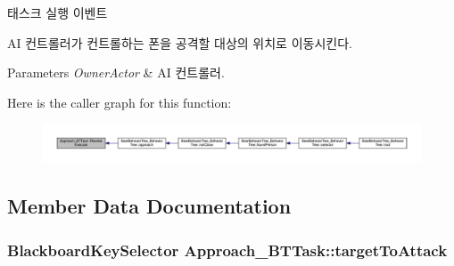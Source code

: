태스크 실행 이벤트 

AI 컨트롤러가 컨트롤하는 폰을 공격할 대상의 위치로 이동시킨다. 
\begin{DoxyParams}{Parameters}
{\em Owner\+Actor} & AI 컨트롤러. \\
\hline
\end{DoxyParams}


Here is the caller graph for this function\+:\nopagebreak
\begin{figure}[H]
\begin{center}
\leavevmode
\includegraphics[width=350pt]{class_approach___b_t_task_aab5432bc101b98aaed56ed2880688a14_icgraph}
\end{center}
\end{figure}




\subsection{Member Data Documentation}
\subsubsection[{\texorpdfstring{target\+To\+Attack}{targetToAttack}}]{\setlength{\rightskip}{0pt plus 5cm}Blackboard\+Key\+Selector Approach\+\_\+\+B\+T\+Task\+::target\+To\+Attack}\hypertarget{class_approach___b_t_task_a0af1525e9ae6377da4fecc32e1dfe5f3}{}\label{class_approach___b_t_task_a0af1525e9ae6377da4fecc32e1dfe5f3}
